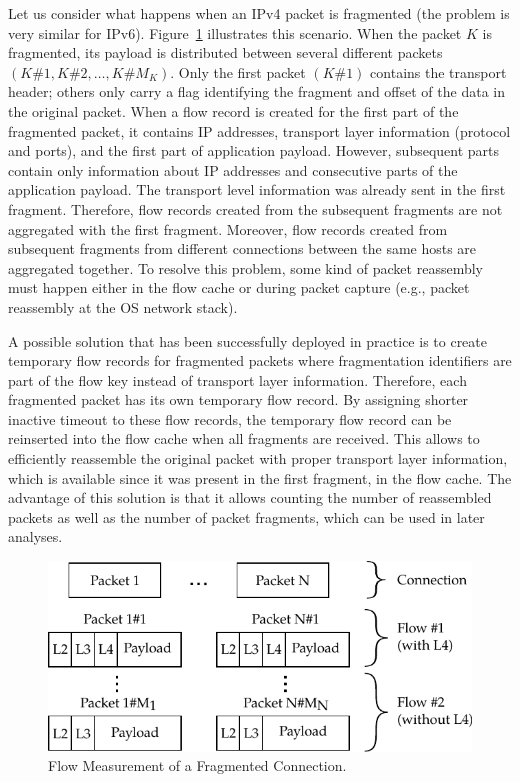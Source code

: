 Let us consider what happens when an IPv4 packet is fragmented (the problem is very similar for IPv6). Figure~\ref{fig:fragmented-flow} illustrates this scenario. When the packet $K$ is fragmented, its payload is distributed between several different packets $(K\#1, K\#2, \ldots, K\#M_K)$. Only the first packet $(K\#1)$ contains the transport header; others only carry a flag identifying the fragment and offset of the data in the original packet. When a flow record is created for the first part of the fragmented packet, it contains IP addresses, transport layer information (protocol and ports), and the first part of application payload. However, subsequent parts contain only information about IP addresses and consecutive parts of the application payload. The transport level information was already sent in the first fragment. Therefore, flow records created from the subsequent fragments are not aggregated with the first fragment. Moreover, flow records created from subsequent fragments from different connections between the same hosts are aggregated together. To resolve this problem, some kind of packet reassembly must happen either in the flow cache or during packet capture (e.g., packet reassembly at the OS network stack).

A possible solution that has been successfully deployed in practice is to create temporary flow records for fragmented packets where fragmentation identifiers are part of the flow key instead of transport layer information. Therefore, each fragmented packet has its own temporary flow record. By assigning shorter inactive timeout to these flow records, the temporary flow record can be reinserted into the flow cache when all fragments are received. This allows to efficiently reassemble the original packet with proper transport layer information, which is available since it was present in the first fragment, in the flow cache. The advantage of this solution is that it allows counting the number of reassembled packets as well as the number of packet fragments, which can be used in later analyses.

\begin{figure}[ht!]
  \begin{center}
    \includegraphics{figures/c02/fragmented-flow}
  \end{center}
  \caption{Flow Measurement of a Fragmented Connection.}
  \label{fig:fragmented-flow}
\end{figure}

